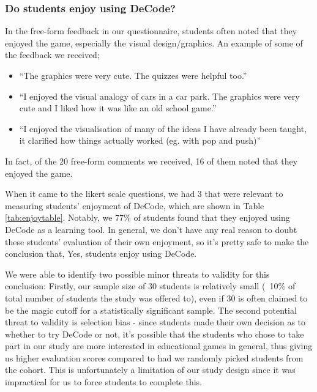 \documentclass[10pt]{article}
\begin{document}
\subsubsection{Do students enjoy using DeCode?}
In the free-form feedback in our questionnaire, students often noted that they enjoyed the game, especially the visual design/graphics. An example of some of the feedback we received;
\begin{itemize}
  \item ``The graphics were very cute. The quizzes were helpful too.''
  \item ``I enjoyed the visual analogy of cars in a car park. The graphics were very cute and I liked how it was like an old school game.''
  \item ``I enjoyed the visualisation of many of the ideas I have already been taught, it clarified how things actually worked (eg. with pop and push)''
\end{itemize}
In fact, of the 20 free-form comments we received, 16 of them noted that they enjoyed the game.\par
When it came to the likert scale questions, we had 3 that were relevant to measuring students' enjoyment of DeCode, which are shown in Table \ref{tab:enjoytable}. Notably, we 77\% of students found that they enjoyed using DeCode as a learning tool. In general, we don't have any real reason to doubt these students' evaluation of their own enjoyment, so it's pretty safe to make the conclusion that, Yes, students enjoy using DeCode.\par
We were able to identify two possible minor threats to validity for this conclusion: Firstly, our sample size of 30 students is relatively small (~10\% of total number of students the study was offered to), even if 30 is often claimed to be the magic cutoff for a statistically significant sample. The second potential threat to validity is selection bias - since students made their own decision as to whether to try DeCode or not, it's possible that the students who chose to take part in our study are more interested in educational games in general, thus giving us higher evaluation scores compared to had we randomly picked students from the cohort. This is unfortunately a limitation of our study design since it was impractical for us to force students to complete this.
\end{document}
